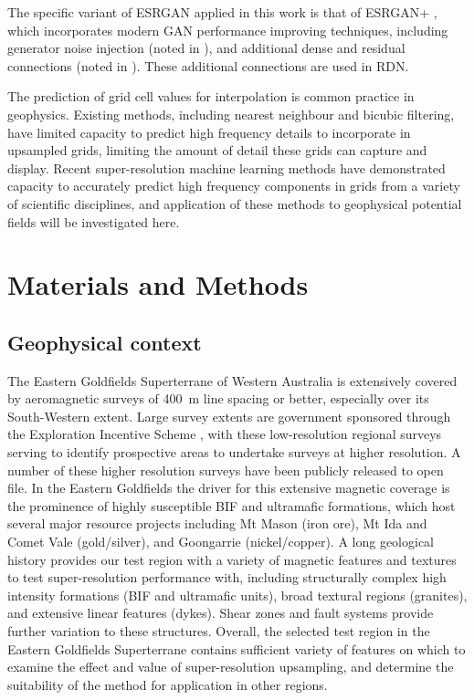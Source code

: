 \documentclass[manuscript.tex]{subfiles}
\begin{document}
The specific variant of ESRGAN applied in this work is that of ESRGAN+ \parencite{rakotonirinaESRGANFurtherImproving2020}, which incorporates modern GAN performance improving techniques, including generator noise injection (noted in ), and additional dense and residual connections (noted in ).
These additional connections are used in RDN\textdaggerdbl{}.

The prediction of grid cell values for interpolation is common practice in geophysics.
Existing methods, including nearest neighbour and bicubic filtering, have limited capacity to predict high frequency details to incorporate in upsampled grids, limiting the amount of detail these grids can capture and display.
Recent super-resolution machine learning methods have demonstrated capacity to accurately predict high frequency components in grids from a variety of scientific disciplines, and application of these methods to geophysical potential fields will be investigated here.

\section{Materials and Methods}
\subsection{Geophysical context}
The Eastern Goldfields Superterrane of Western Australia is extensively covered by aeromagnetic surveys of \qty{400}{\metre} line spacing or better, especially over its South-Western extent.
Large survey extents are government sponsored through the Exploration Incentive Scheme \parencite[e.g.][]{griffinStimulatingGreenfieldsExploration2010}, with these low-resolution regional surveys serving to identify prospective areas to undertake surveys at higher resolution.
A number of these higher resolution surveys have been publicly released to open file.
In the Eastern Goldfields the driver for this extensive magnetic coverage is the prominence of highly susceptible BIF and ultramafic formations, which host several major resource projects including Mt Mason (iron ore), Mt Ida and Comet Vale (gold/silver), and Goongarrie (nickel/copper).
A long geological history provides our test region with a variety of magnetic features and textures to test super-resolution performance with, including structurally complex high intensity formations (BIF and ultramafic units), broad textural regions (granites), and extensive linear features (dykes).
Shear zones and fault systems provide further variation to these structures.
Overall, the selected test region in the Eastern Goldfields Superterrane contains sufficient variety of features on which to examine the effect and value of super-resolution upsampling, and determine the suitability of the method for application in other regions.
\end{document}
